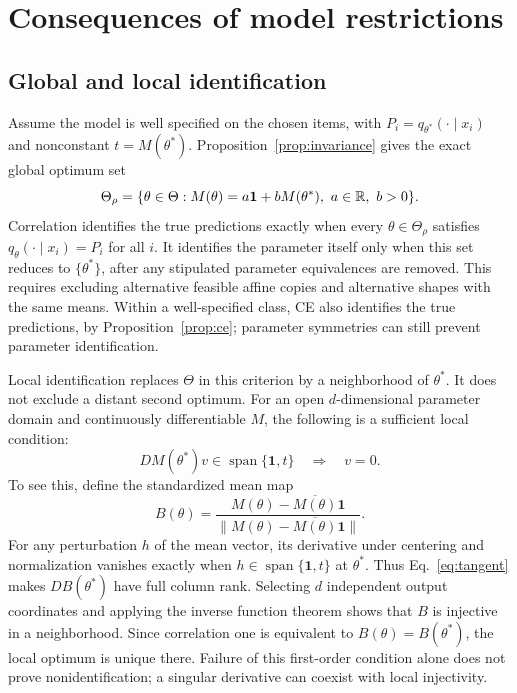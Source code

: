 \section{Consequences of model restrictions}
\subsection{Global and local identification}
Assume the model is well specified on the chosen items, with $P_i=q_{\theta^\ast}(\cdot\mid x_i)$ and nonconstant $t=M(\theta^\ast)$.
Proposition~\ref{prop:invariance} gives the exact global optimum set
\begin{equation}\label{eq:thetaset}
 \Theta_\rho=\{\theta\in\Theta:M(\theta)=a\mathbf1+bM(\theta^\ast),\ a\in\R,\ b>0\}.
\end{equation}
Correlation identifies the true predictions exactly when every $\theta\in\Theta_\rho$ satisfies $q_\theta(\cdot\mid x_i)=P_i$ for all $i$.
It identifies the parameter itself only when this set reduces to $\{\theta^\ast\}$, after any stipulated parameter equivalences are removed.
This requires excluding alternative feasible affine copies and alternative shapes with the same means.
Within a well-specified class, CE also identifies the true predictions, by Proposition~\ref{prop:ce}; parameter symmetries can still prevent parameter identification.

Local identification replaces $\Theta$ in this criterion by a neighborhood of $\theta^\ast$.
It does not exclude a distant second optimum.
For an open $d$-dimensional parameter domain and continuously differentiable $M$, the following is a sufficient local condition:
\begin{equation}\label{eq:tangent}
 DM(\theta^\ast)v\in\operatorname{span}\{\mathbf1,t\}\quad\Longrightarrow\quad v=0.
\end{equation}
To see this, define the standardized mean map
\[
 B(\theta)=\frac{M(\theta)-\overline{M(\theta)}\mathbf1}{\|M(\theta)-\overline{M(\theta)}\mathbf1\|}.
\]
For any perturbation $h$ of the mean vector, its derivative under centering and normalization vanishes exactly when $h\in\operatorname{span}\{\mathbf1,t\}$ at $\theta^\ast$.
Thus Eq.~\eqref{eq:tangent} makes $DB(\theta^\ast)$ have full column rank.
Selecting $d$ independent output coordinates and applying the inverse function theorem shows that $B$ is injective in a neighborhood.
Since correlation one is equivalent to $B(\theta)=B(\theta^\ast)$, the local optimum is unique there.
Failure of this first-order condition alone does not prove nonidentification; a singular derivative can coexist with local injectivity.

